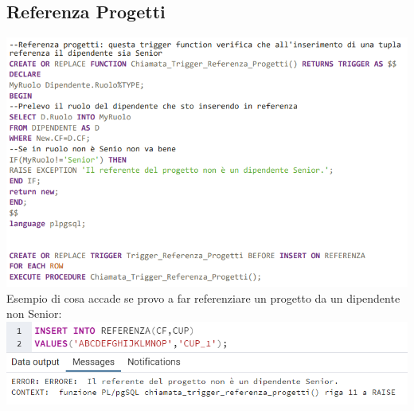 \subsection{Referenza Progetti}
\includegraphics[width=1\textwidth]{Immagini/referenza.sql}
\newline\newline
Esempio di cosa accade se provo a far referenziare un progetto da un dipendente non Senior:
\newline\newline
\includegraphics[width=1\textwidth]{Immagini/refes}



 

